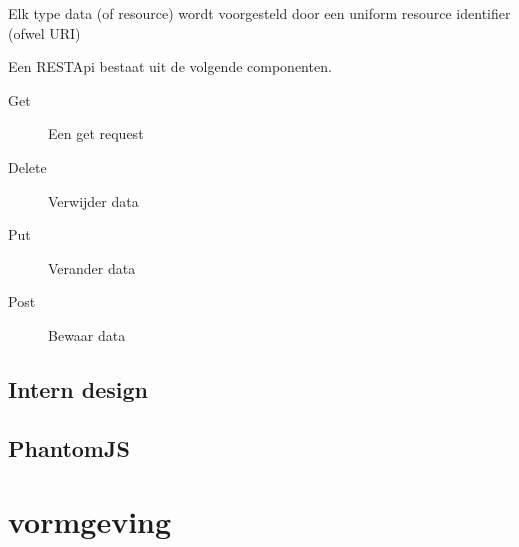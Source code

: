 \documentclass[a4paper,11pt]{article}
\begin{document}
Elk type data (of resource) wordt voorgesteld door een uniform resource
identifier (ofwel URI)

Een RESTApi bestaat uit de volgende componenten.
\begin{description}
  \item [Get] Een get request
  \item [Delete] Verwijder data
  \item [Put] Verander data
  \item [Post] Bewaar data
\end{description}

\subsection{Intern design}

\subsection{PhantomJS}

\section{vormgeving}

\end{document}

